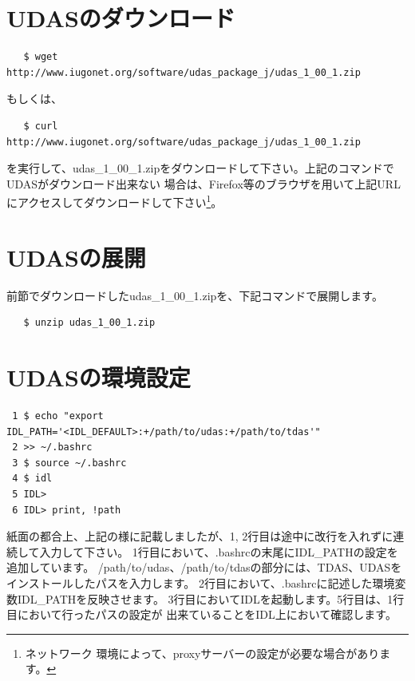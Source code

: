 \documentclass[a4j]{jbook}
\begin{document}
\section{UDASのダウンロード}
\begin{screen}
\begin{verbatim}
   $ wget http://www.iugonet.org/software/udas_package_j/udas_1_00_1.zip
\end{verbatim}
\end{screen}
もしくは、
\begin{screen}
\begin{verbatim}
   $ curl http://www.iugonet.org/software/udas_package_j/udas_1_00_1.zip
\end{verbatim}
\end{screen}
を実行して、udas\_1\_00\_1.zipをダウンロードして下さい。上記のコマンドでUDASがダウンロード出来ない
場合は、Firefox等のブラウザを用いて上記URLにアクセスしてダウンロードして下さい\footnote{ネットワーク
環境によって、proxyサーバーの設定が必要な場合があります。}。

\section{UDASの展開}
前節でダウンロードしたudas\_1\_00\_1.zipを、下記コマンドで展開します。
\begin{screen}
\begin{verbatim}
   $ unzip udas_1_00_1.zip
\end{verbatim}
\end{screen}

\section{UDASの環境設定}

\begin{screen}
\begin{verbatim}
 1 $ echo "export IDL_PATH='<IDL_DEFAULT>:+/path/to/udas:+/path/to/tdas'" 
 2 >> ~/.bashrc
 3 $ source ~/.bashrc
 4 $ idl
 5 IDL>
 6 IDL> print, !path
\end{verbatim}
\end{screen}
紙面の都合上、上記の様に記載しましたが、1, 2行目は途中に改行を入れずに連続して入力して下さい。
1行目において、.bashrcの末尾にIDL\_PATHの設定を追加しています。
/path/to/udas、/path/to/tdasの部分には、TDAS、UDASをインストールしたパスを入力します。
2行目において、.bashrcに記述した環境変数IDL\_PATHを反映させます。
3行目においてIDLを起動します。5行目は、1行目において行ったパスの設定が
出来ていることをIDL上において確認します。
\end{document}
